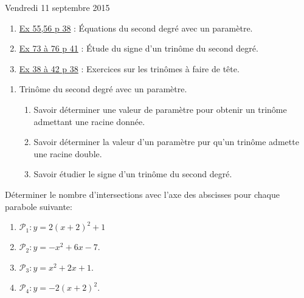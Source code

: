 \documentclass[a4paper,11pt]{article}
\theoremstyle{break}
\begin{document}
   Vendredi 11 septembre 2015
   
   \begin{enumerate}
    \item 
      \href{https://github.com/mathlorgues/math1sd1516/blob/master/images/55-56p38.png}
   {Ex 55,56 p 38} : \'Equations du second degré avec un paramètre.
   
   \item
   \href{https://github.com/mathlorgues/math1sd1516/blob/master/images/73-76p41.png}
   {Ex 73 à 76 p 41} : \'Etude du signe d'un trinôme du second degré.
   
   \item
   \href{https://github.com/mathlorgues/math1sd1516/blob/master/20150907/38-42p38.jpg}
   {Ex 38 à 42 p 38} : Exercices sur les trinômes à faire de tête.
   
   \end{enumerate}


   \begin{Dev}
     
     \begin{enumerate}
      \item Trinôme du second degré avec un paramètre. 
      \begin{enumerate}
      \item Savoir déterminer une valeur de paramètre pour obtenir un trinôme admettant
      une racine donnée.
      \item Savoir déterminer la valeur d'un paramètre pur qu'un trinôme admette
      une racine double.
      \item Savoir étudier le signe d'un trinôme du second degré.
     \end{enumerate}
   \end{enumerate}
   


  \vspace{0.5cm}
      
      \begin{dm}
	
	Déterminer le nombre d'intersections avec l'axe des abscisses pour chaque parabole
	suivante:
	\begin{enumerate}
	  \item $\mathcal{P}_1:y=2(x+2)^2+1$
	  \item $\mathcal{P}_2:y=-x^2+6x-7$.%
	  \item $\mathcal{P}_3:y=x^2+2x+1$.
	  \item $\mathcal{P}_4:y=-2(x+2)^2$.
	\end{enumerate} 
      \end{dm}
      
      \end{Dev}
  
\end{document}
